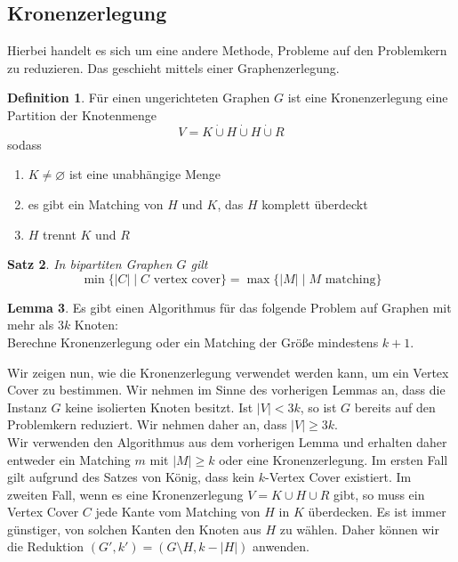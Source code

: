\documentclass[a4paper, 12pt]{article}
\theoremstyle{plain}
\newtheorem{theorem}{Satz}[section] %
\theoremstyle{definition}
\newtheorem{definition}[theorem]{Definition} %
\theoremstyle{lemma}
\newtheorem{lemma}[theorem]{Lemma}
\theoremstyle{remark}
\theoremstyle{corollary}
\theoremstyle{example}
\begin{document}
	\subsection{Kronenzerlegung}
	Hierbei handelt es sich um eine andere Methode, Probleme auf den Problemkern zu reduzieren. Das geschieht mittels einer Graphenzerlegung.
	\begin{definition}
		Für einen ungerichteten Graphen $G$ ist eine Kronenzerlegung eine Partition der Knotenmenge \[V = K \dot \cup H \dot \cup H \dot \cup R\] sodass \begin{enumerate}
			\item $K \neq \varnothing$ ist eine unabhängige Menge
			\item es gibt ein Matching von $H$ und $K$, das $H$ komplett überdeckt
			\item $H$ trennt $K$ und $R$
		\end{enumerate}
	\end{definition}
	\begin{theorem}
		In bipartiten Graphen $G$ gilt \[\min\{\left|C\right| \mid C \text{ vertex cover}\} = \max\{\left|M\right| \mid M \text{ matching}\}\]
	\end{theorem}
	\begin{lemma}
		Es gibt einen Algorithmus für das folgende Problem auf Graphen mit mehr als $3k$ Knoten:\\
		Berechne Kronenzerlegung oder ein Matching der Größe mindestens $k+1$.
	\end{lemma}
	Wir zeigen nun, wie die Kronenzerlegung verwendet werden kann, um ein Vertex Cover zu bestimmen. Wir nehmen im Sinne des vorherigen Lemmas an, dass die Instanz $G$ keine isolierten Knoten besitzt. Ist $\left|V\right| <3k$, so ist $G$ bereits auf den Problemkern reduziert. Wir nehmen daher an, dass $\left|V\right| \geq 3k$.\\
	Wir verwenden den Algorithmus aus dem vorherigen Lemma und erhalten daher entweder ein Matching $m$ mit $\left|M\right|\geq k$ oder eine Kronenzerlegung. Im ersten Fall gilt aufgrund des Satzes von König, dass kein $k$-Vertex Cover existiert. Im zweiten Fall, wenn es eine Kronenzerlegung $V = K\cup H \cup R$ gibt, so muss ein Vertex Cover $C$ jede Kante vom Matching von $H$ in $K$ überdecken. Es ist immer günstiger, von solchen Kanten den Knoten aus $H$ zu wählen. Daher können wir die Reduktion $(G',k') = (G\setminus H, k - \left|H\right|)$ anwenden.\\
	
\end{document}
